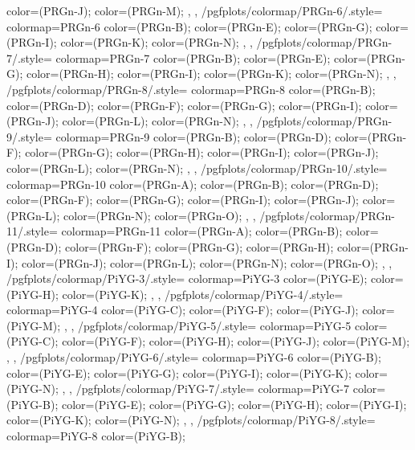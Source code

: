{{{      color=(PRGn-J);
      color=(PRGn-M);
    },
  },
  /pgfplots/colormap/PRGn-6/.style={
    colormap={PRGn-6}{
      color=(PRGn-B);
      color=(PRGn-E);
      color=(PRGn-G);
      color=(PRGn-I);
      color=(PRGn-K);
      color=(PRGn-N);
    },
  },
  /pgfplots/colormap/PRGn-7/.style={
    colormap={PRGn-7}{
      color=(PRGn-B);
      color=(PRGn-E);
      color=(PRGn-G);
      color=(PRGn-H);
      color=(PRGn-I);
      color=(PRGn-K);
      color=(PRGn-N);
    },
  },
  /pgfplots/colormap/PRGn-8/.style={
    colormap={PRGn-8}{
      color=(PRGn-B);
      color=(PRGn-D);
      color=(PRGn-F);
      color=(PRGn-G);
      color=(PRGn-I);
      color=(PRGn-J);
      color=(PRGn-L);
      color=(PRGn-N);
    },
  },
  /pgfplots/colormap/PRGn-9/.style={
    colormap={PRGn-9}{
      color=(PRGn-B);
      color=(PRGn-D);
      color=(PRGn-F);
      color=(PRGn-G);
      color=(PRGn-H);
      color=(PRGn-I);
      color=(PRGn-J);
      color=(PRGn-L);
      color=(PRGn-N);
    },
  },
  /pgfplots/colormap/PRGn-10/.style={
    colormap={PRGn-10}{
      color=(PRGn-A);
      color=(PRGn-B);
      color=(PRGn-D);
      color=(PRGn-F);
      color=(PRGn-G);
      color=(PRGn-I);
      color=(PRGn-J);
      color=(PRGn-L);
      color=(PRGn-N);
      color=(PRGn-O);
    },
  },
  /pgfplots/colormap/PRGn-11/.style={
    colormap={PRGn-11}{
      color=(PRGn-A);
      color=(PRGn-B);
      color=(PRGn-D);
      color=(PRGn-F);
      color=(PRGn-G);
      color=(PRGn-H);
      color=(PRGn-I);
      color=(PRGn-J);
      color=(PRGn-L);
      color=(PRGn-N);
      color=(PRGn-O);
    },
  },
  /pgfplots/colormap/PiYG-3/.style={
    colormap={PiYG-3}{
      color=(PiYG-E);
      color=(PiYG-H);
      color=(PiYG-K);
    },
  },
  /pgfplots/colormap/PiYG-4/.style={
    colormap={PiYG-4}{
      color=(PiYG-C);
      color=(PiYG-F);
      color=(PiYG-J);
      color=(PiYG-M);
    },
  },
  /pgfplots/colormap/PiYG-5/.style={
    colormap={PiYG-5}{
      color=(PiYG-C);
      color=(PiYG-F);
      color=(PiYG-H);
      color=(PiYG-J);
      color=(PiYG-M);
    },
  },
  /pgfplots/colormap/PiYG-6/.style={
    colormap={PiYG-6}{
      color=(PiYG-B);
      color=(PiYG-E);
      color=(PiYG-G);
      color=(PiYG-I);
      color=(PiYG-K);
      color=(PiYG-N);
    },
  },
  /pgfplots/colormap/PiYG-7/.style={
    colormap={PiYG-7}{
      color=(PiYG-B);
      color=(PiYG-E);
      color=(PiYG-G);
      color=(PiYG-H);
      color=(PiYG-I);
      color=(PiYG-K);
      color=(PiYG-N);
    },
  },
  /pgfplots/colormap/PiYG-8/.style={
    colormap={PiYG-8}{
      color=(PiYG-B);
}}}
